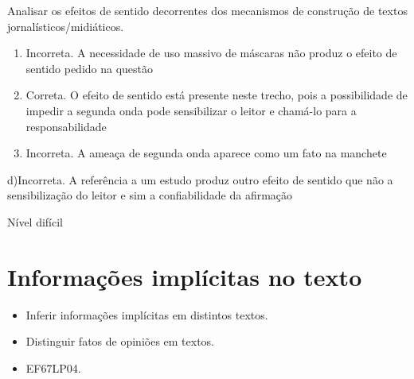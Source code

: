 Analisar os efeitos de sentido decorrentes dos mecanismos de construção
de textos jornalísticos/midiáticos.

\begin{enumerate}
\def\labelenumi{\arabic{enumi}.}
\item
  Incorreta. A necessidade de uso massivo de máscaras não produz o
  efeito de sentido pedido na questão
\item
  Correta. O efeito de sentido está presente neste trecho, pois a
  possibilidade de impedir a segunda onda pode sensibilizar o leitor e
  chamá-lo para a responsabilidade
\item
  Incorreta. A ameaça de segunda onda aparece como um fato na manchete
\end{enumerate}

d)Incorreta. A referência a um estudo produz outro efeito de sentido que
não a sensibilização do leitor e sim a confiabilidade da afirmação

Nível difícil


\chapter{Informações implícitas no texto}


\begin{itemize} 

  \item Inferir informações implícitas em distintos textos.

  \item Distinguir fatos de opiniões em textos.

\end{itemize}


\begin{itemize} 

  \item EF67LP04.

\end{itemize} 

